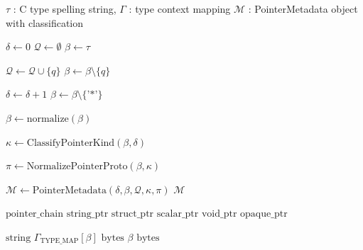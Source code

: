 \begin{algorithm}[H]
\caption{Pointer Classification and Metadata Extraction}
\label{alg:pointer_classification}
\begin{algorithmic}[1]
\REQUIRE $\tau$ : C type spelling string, $\Gamma$ : type context mapping
\ENSURE $\mathcal{M}$ : PointerMetadata object with classification

    \STATE $\delta \leftarrow 0$ 
    \STATE $\mathcal{Q} \leftarrow \emptyset$ 
    \STATE $\beta \leftarrow \tau$ 

    \STATE {}
            \STATE $\mathcal{Q} \leftarrow \mathcal{Q} \cup \{q\}$
            \STATE $\beta \leftarrow \beta \setminus \{q\}$ 
        \ENDIF
    \ENDFOR

    \STATE {}
        \STATE $\delta \leftarrow \delta + 1$
        \STATE $\beta \leftarrow \beta \setminus \{\text{'*'}\}$
    \ENDWHILE

    \STATE $\beta \leftarrow \text{normalize}(\beta)$ 

    \STATE {}
    \STATE $\kappa \leftarrow \text{ClassifyPointerKind}(\beta, \delta)$

    \STATE {}
    \STATE $\pi \leftarrow \text{NormalizePointerProto}(\beta, \kappa)$

    \STATE {}
    \STATE $\mathcal{M} \leftarrow \text{PointerMetadata}(\delta, \beta, \mathcal{Q}, \kappa, \pi)$
    \RETURN $\mathcal{M}$
\ENDPROCEDURE

\vspace{0.3cm}

        \RETURN $\text{pointer\_chain}$
        \RETURN $\text{string\_ptr}$
        \RETURN $\text{struct\_ptr}$
        \RETURN $\text{scalar\_ptr}$
        \RETURN $\text{void\_ptr}$
    \ELSE
        \RETURN $\text{opaque\_ptr}$
    \ENDIF
\ENDPROCEDURE

\vspace{0.3cm}

        \RETURN $\text{string}$
        \RETURN $\Gamma_{\text{TYPE\_MAP}}[\beta]$
        \RETURN $\text{bytes}$
        \RETURN $\beta$ 
    \ELSE
        \RETURN $\text{bytes}$ 
    \ENDIF
\ENDPROCEDURE

\end{algorithmic}
\end{algorithm}


